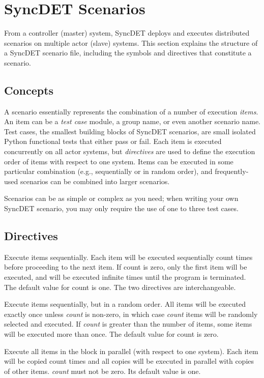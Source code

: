 \section{SyncDET Scenarios}

From a controller (master) system, SyncDET deploys and executes distributed
scenarios on multiple actor (slave) systems. This section explains the structure
of a SyncDET scenario file, including the symbols and directives that constitute
a scenario.

\subsection{Concepts}
A scenario essentially represents the combination of a number of execution {\em
items}. An item can be a {\em test case} module, a group name, or even another
scenario name. Test cases, the smallest building blocks of SyncDET scenarios,
are small isolated Python functional tests that either pass or fail. Each item
is executed concurrently on all actor systems, but {\em directives} are used to
define the execution order of items with respect to one system.  Items can be
executed in some particular combination (e.g., sequentially or in random order),
and frequently-used scenarios can be combined into larger scenarios.

Scenarios can be as simple or complex as you need; when writing your own SyncDET
scenario, you may only require the use of one to three test cases.

\subsection{Directives}

Execute items sequentially. Each item will be executed sequentially count times
before proceeding to the next item. If count is zero, only the first item will
be executed, and will be executed infinite times until the program is
terminated. The default value for count is one. The two directives are
interchangeable.

Execute items sequentially, but in a random order. All items will be executed
exactly once unless {\it count} is non-zero, in which case {\it count} items
will be randomly selected and executed. If {\it count} is greater than the
number of items, some items will be executed more than once. The default value
for count is zero.

Execute all items in the block in parallel (with respect to one system). Each
item will be copied count times and all copies will be executed in parallel with
copies of other items. {\it count} must not be zero. Its default value is one.

